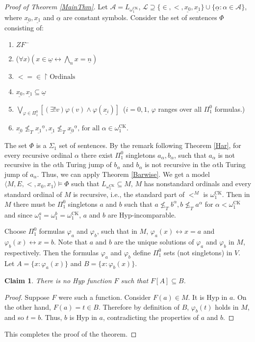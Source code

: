 \documentclass[11pt, english]{article}
\newtheorem{claim}{Claim}
\newcommand{\A}{\mbox{$\mathcal{A}$}}
\newcommand{\LL}{\mbox{$\mathcal{L}$}}
\DeclareMathOperator{\ck}{CK}
\begin{document}
\begin{proof}[Proof of Theorem \ref{MainThm}]
Let $\A=L_{\omega_1^{\ck}}$,
$\LL\supseteq\{\in,<,\underline{x_0},\underline{x_1}\}\cup\{\underline{\alpha}:\alpha\in
\A\}$, where $\underline{x_0},\underline{x_1}$ and
$\underline{\alpha}$ are constant symbols. Consider the set of
sentences $\Phi$ consisting of:
\begin{enumerate}[(1)]
 \item $ZF^-$
 \item ($\forall x)(x\in \underline{\omega}\leftrightarrow \bigwedge_n x=\underline{n})$
 \item $<=\in\upharpoonright\text{Ordinals}$
 \item $\underline{x_0},\underline{x_1}\subseteq\underline\omega$
 \item $\bigvee_{\varphi\in\Pi^0_1}\left[(\exists!v)\varphi(v)\wedge\varphi(\underline{x_i})\right]$\ ($i=0,1$, $\varphi$ ranges over all $\Pi^0_1$
 formulas.)
 \item $\underline{x_0}\nleq_T \underline{x_1}^{\underline{\alpha}}, \underline{x_1}\nleq_T \underline{x_0}^{\underline{\alpha}}\text{, for all }\alpha\in \omega_1^{\ck}\text{.}$

\end{enumerate}
The set $\Phi$ is a $\Sigma_1$ set of sentences. By the remark
following Theorem \ref{Har}, for every recursive ordinal $\alpha$
there exist $\Pi^0_1$ singletons $a_{\alpha},b_{\alpha}$, such that
$a_{\alpha}$ is not recursive in the $\alpha$th Turing jump of
$b_{\alpha}$ and $b_{\alpha}$ is not recursive in the $\alpha$th
Turing jump of $a_{\alpha}$. Thus, we can apply Theorem
\ref{Barwise}. We get a model $\langle
M,E,<,x_0,x_1\rangle\models\Phi$ such that
$L_{\omega_1^{\ck}}\subseteq M$, $M$ has nonstandard ordinals and
every standard ordinal of $M$ is recursive, i.e., the standard part
of $<^M$ is $\omega_1^{\ck}$. Then in $M$ there must be $\Pi^0_1$ singletons $a$ and $b$
such that $a\nleq_T b^{\alpha}, b\nleq_T
a^{\alpha}$ for $\alpha<\omega_1^{\ck}$ and since
$\omega_1^a=\omega_1^b=\omega_1^{\ck}$, $a$ and $b$ are
Hyp-incomparable.

Choose $\Pi^0_1$ formulas $\varphi_a$ and $\varphi_b$, such that in
$M$, $\varphi_a(x)\leftrightarrow x=a$ and
$\varphi_b(x)\leftrightarrow x=b$. Note that $a$ and $b$ are the
unique solutions of $\varphi_a$ and $\varphi_b$ in $M$,
respectively. Then the formulas $\varphi_a$ and $\varphi_b$ define
$\Pi^0_1$ sets (not singletons) in ${V}$. Let $A=\{x:\varphi_a(x)\}$
and $B=\{x:\varphi_b(x)\}$.

\begin{claim}\label{IncSets}
There is no Hyp function $F$ such that $F[A]\subseteq B$.
\end{claim}

\begin{proof}
Suppose $F$ were such a function. Consider $F(a)\in M$. It is Hyp in
$a$. On the other hand, $F(a)=t\in B$. Therefore by definition of
$B$, $\varphi_b(t)$ holds in $M$, and so $t=b$. Thus, $b$ is Hyp in
$a$, contradicting the properties of $a$ and $b$.
\end{proof}

This completes the proof of the theorem.
\end{proof}
\end{document}
